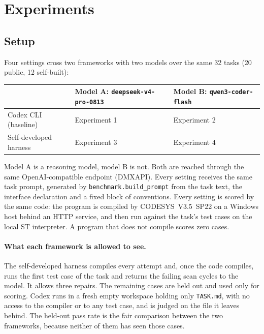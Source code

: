 
\section{Experiments}

\subsection{Setup}

Four settings cross two frameworks with two models over the same 32 tasks
(20 public, 12 self-built):

\begin{table}[h]
\centering
\small
\begin{tabular}{@{}lll@{}}
\toprule
 & \textbf{Model A}: \texttt{deepseek-v4-pro-0813} & \textbf{Model B}: \texttt{qwen3-coder-flash} \\
\midrule
Codex CLI (baseline)   & Experiment 1 & Experiment 2 \\
Self-developed harness & Experiment 3 & Experiment 4 \\
\bottomrule
\end{tabular}
\end{table}

Model A is a reasoning model, model B is not. Both are reached through the
same OpenAI-compatible endpoint (DMXAPI). Every setting receives the same task
prompt, generated by \texttt{benchmark.build\_prompt} from the task text, the
interface declaration and a fixed block of conventions. Every setting is scored
by the same code: the program is compiled by CODESYS~V3.5~SP22 on a Windows
host behind an HTTP service, and then run against the task's test cases on the
local ST interpreter. A program that does not compile scores zero cases.

\paragraph{What each framework is allowed to see.}
The self-developed harness compiles every attempt and, once the code compiles,
runs the first test case of the task and returns the failing scan cycles to the
model. It allows three repairs. The remaining cases are held out and used only
for scoring. Codex runs in a fresh empty workspace holding only
\texttt{TASK.md}, with no access to the compiler or to any test case, and is
judged on the file it leaves behind. The held-out pass rate is the fair
comparison between the two frameworks, because neither of them has seen those
cases.

